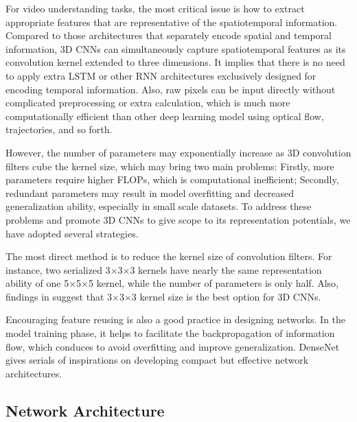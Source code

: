 \documentclass[10pt,twocolumn,letterpaper]{article}
\begin{document}
For video understanding tasks, the most critical issue is how to extract appropriate features that are representative of the spatiotemporal information.
Compared to those architectures that separately encode spatial and temporal information, 3D CNNs can simultaneously capture spatiotemporal features as its convolution kernel extended to three dimensions. 
It implies that there is no need to apply extra LSTM or other RNN architectures exclusively designed for encoding temporal information. 
Also, raw pixels can be input directly without complicated preprocessing or extra calculation, which is much more computationally efficient than other deep learning model using optical flow, trajectories, and so forth.

However, the number of parameters may  exponentially increase as 3D convolution filters cube the kernel size, which may bring two main problems: 
Firstly, more parameters require higher FLOPs, which is computational inefficient; 
Secondly, redundant parameters may result in model overfitting and decreased generalization ability, especially in small scale datasets. 
To address these problems and promote 3D CNNs to give scope to its representation potentials, we have adopted several strategies.

The most direct method is to reduce the kernel size of convolution filters. 
For instance, two serialized 3$\times$3$\times$3 kernels have nearly the same representation ability of one 5$\times$5$\times$5 kernel, while the number of parameters is only half. 
Also, findings in \cite{3dcnn_1, 3dcnn_2, r2+1d} suggest that 3$\times$3$\times$3 kernel size is the best option for 3D CNNs.

Encouraging feature reusing is also a good practice in designing networks. 
In the model training phase, it helps to facilitate the backpropagation of information flow, which conduces to avoid overfitting and improve generalization. 
DenseNet \cite{densenet} gives serials of inspirations on developing compact but effective network architectures.

\subsection{Network Architecture}
\end{document}
